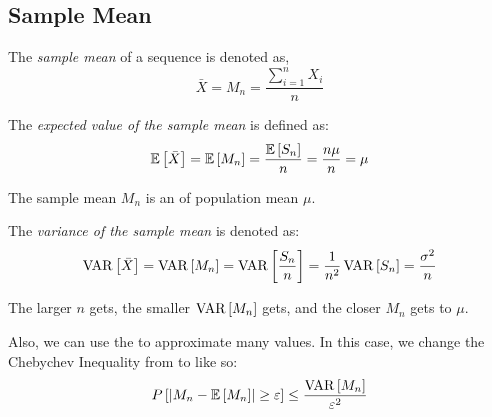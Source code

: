 	\subsection{Sample Mean} \label{subsec:Sample Mean}
		\begin{definition} \label{def:Sample Mean}
			The \emph{sample mean} of a sequence is denoted as,
			\begin{equation} \label{eq:Sample Mean}
				\bar{X} = M_{n} = \frac{\sum_{i=1}^{n} X_{i}}{n}
			\end{equation}
		\end{definition}
		\begin{definition} \label{def:Expected Value of Sample Mean}
			The \emph{expected value of the sample mean} is defined as:
			\begin{equation} \label{eq:Expected Value of Sample Mean}
				\operatorname{\operatorname{\mathbb{E}}} \left[ \bar{X} \right]
				= \operatorname{\operatorname{\mathbb{E}}} \left[ M_{n} \right]
				= \frac{\operatorname{\operatorname{\mathbb{E}}} \left[ S_{n} \right]}{n}
				= \frac{n \mu}{n}
				= \mu
			\end{equation}
			\begin{remark}
				The sample mean $M_{n}$ is an \emph{} of population mean $\mu$.
			\end{remark}
		\end{definition}
		\begin{definition} \label{def:Variance of Sample Mean}
			The \emph{variance of the sample mean} is denoted as:
			\begin{equation} \label{eq:Variance of Sample Mean}
				\operatorname{\operatorname{VAR}} \left[ \bar{X} \right]
				= \operatorname{\operatorname{VAR}} \left[ M_{n} \right]
				= \operatorname{\operatorname{VAR}} \left[ \frac{S_{n}}{n} \right]
				= \frac{1}{n^{2}} \operatorname{\operatorname{VAR}} \left[ S_{n} \right]
				= \frac{\sigma^{2}}{n}
			\end{equation}
			\begin{remark}
				The larger $n$ gets, the smaller $\operatorname{\operatorname{VAR}} \left[ M_{n} \right]$ gets, and the closer $M_{n}$ gets to $\mu$.
			\end{remark}
		\end{definition}
			
	Also, we can use the  to approximate many values. In this case, we change the Chebychev Inequality from  to  like so:
		\begin{equation} \label{eq:Statistics Chebychev Inequality}
			P \left[ \lvert M_{n} - \operatorname{\operatorname{\mathbb{E}}} \left[ M_{n} \right] \rvert \geq \varepsilon \right] \leq \frac{\operatorname{\operatorname{VAR}} \left[ M_{n} \right]}{\varepsilon^{2}}
		\end{equation}
		
